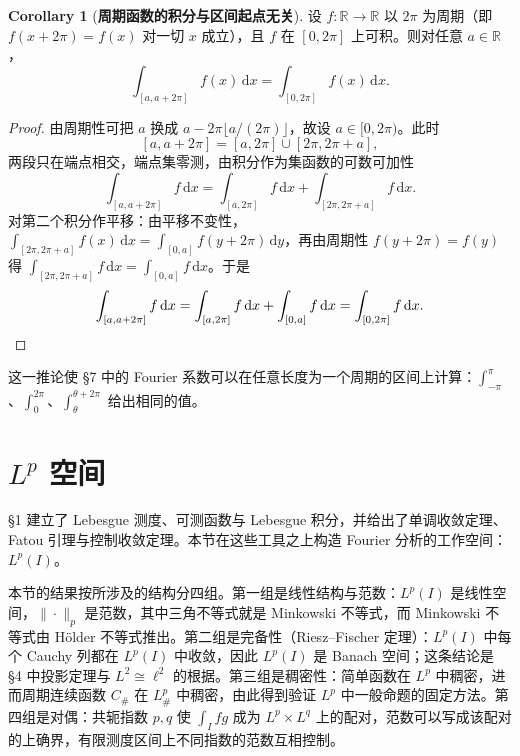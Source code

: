 \documentclass[oneside]{book}
\theoremstyle{definition}
\newcommand{\R}{\mathbb{R}}
\newcommand{\dd}{\mathrm{d}}
\theoremstyle{definition}
\newtheorem{corollary}{Corollary}[section]
\begin{document}
	\begin{corollary}[\bfseries{周期函数的积分与区间起点无关}]
		设 $f:\R\to\R$ 以 $2\pi$ 为周期（即 $f(x+2\pi)=f(x)$ 对一切 $x$ 成立），且 $f$ 在 $[0,2\pi]$ 上可积。则对任意 $a\in\R$，
		\[
		\int_{[a,a+2\pi]}f(x)\,\dd x=\int_{[0,2\pi]}f(x)\,\dd x .
		\]
	\end{corollary}
	
	\begin{proof}
		由周期性可把 $a$ 换成 $a-2\pi\lfloor a/(2\pi)\rfloor$，故设 $a\in[0,2\pi)$。此时
		\[
		[a,a+2\pi]=[a,2\pi]\cup[2\pi,2\pi+a],
		\]
		两段只在端点相交，端点集零测，由积分作为集函数的可数可加性
		\[
		\int_{[a,a+2\pi]}f\,\dd x=\int_{[a,2\pi]}f\,\dd x+\int_{[2\pi,2\pi+a]}f\,\dd x .
		\]
		对第二个积分作平移：由平移不变性，$\int_{[2\pi,2\pi+a]}f(x)\,\dd x=\int_{[0,a]}f(y+2\pi)\,\dd y$，再由周期性 $f(y+2\pi)=f(y)$ 得 $\int_{[2\pi,2\pi+a]}f\,\dd x=\int_{[0,a]}f\,\dd x$。于是
		\[
		\int_{[a,a+2\pi]}f\,\dd x=\int_{[a,2\pi]}f\,\dd x+\int_{[0,a]}f\,\dd x=\int_{[0,2\pi]}f\,\dd x .\qedhere
		\]
	\end{proof}
	
	这一推论使 \S7 中的 Fourier 系数可以在任意长度为一个周期的区间上计算：$\int_{-\pi}^{\pi}$、$\int_0^{2\pi}$、$\int_{\theta}^{\theta+2\pi}$ 给出相同的值。
	
	
	\chapter{$L^p$ 空间}
	
	§1 建立了 Lebesgue 测度、可测函数与 Lebesgue 积分，并给出了单调收敛定理、Fatou 引理与控制收敛定理。本节在这些工具之上构造 Fourier 分析的工作空间：$L^p(I)$。
	
	本节的结果按所涉及的结构分四组。第一组是线性结构与范数：$L^p(I)$ 是线性空间，$\|\cdot\|_p$ 是范数，其中三角不等式就是 Minkowski 不等式，而 Minkowski 不等式由 Hölder 不等式推出。第二组是完备性（Riesz--Fischer 定理）：$L^p(I)$ 中每个 Cauchy 列都在 $L^p(I)$ 中收敛，因此 $L^p(I)$ 是 Banach 空间；这条结论是 §4 中投影定理与 $L^2\cong\ell^2$ 的根据。第三组是稠密性：简单函数在 $L^p$ 中稠密，进而周期连续函数 $C_\#$ 在 $L^p_\#$ 中稠密，由此得到验证 $L^p$ 中一般命题的固定方法。第四组是对偶：共轭指数 $p,q$ 使 $\int_I fg$ 成为 $L^p\times L^q$ 上的配对，范数可以写成该配对的上确界，有限测度区间上不同指数的范数互相控制。
	
\end{document}
